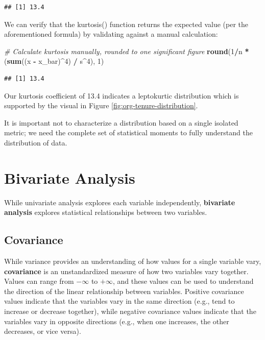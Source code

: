 \documentclass[]{book}
\newenvironment{Shaded}{\begin{snugshade}}{\end{snugshade}}
\newcommand{\CommentTok}[1]{\textcolor[rgb]{0.56,0.35,0.01}{\textit{#1}}}
\newcommand{\DecValTok}[1]{\textcolor[rgb]{0.00,0.00,0.81}{#1}}
\newcommand{\KeywordTok}[1]{\textcolor[rgb]{0.13,0.29,0.53}{\textbf{#1}}}
\newcommand{\NormalTok}[1]{#1}
\newcommand{\OperatorTok}[1]{\textcolor[rgb]{0.81,0.36,0.00}{\textbf{#1}}}
\newcommand{\StringTok}[1]{\textcolor[rgb]{0.31,0.60,0.02}{#1}}
\begin{document}
\begin{verbatim}
## [1] 13.4
\end{verbatim}

We can verify that the kurtosis() function returns the expected value (per the aforementioned formula) by validating against a manual calculation:

\begin{Shaded}
\begin{Highlighting}[]
\CommentTok{# Calculate kurtosis manually, rounded to one significant figure}
\KeywordTok{round}\NormalTok{(}\DecValTok{1}\OperatorTok{/}\NormalTok{n }\OperatorTok{*}\StringTok{ }\NormalTok{(}\KeywordTok{sum}\NormalTok{((x }\OperatorTok{-}\StringTok{ }\NormalTok{x_bar)}\OperatorTok{^}\DecValTok{4}\NormalTok{) }\OperatorTok{/}\StringTok{ }\NormalTok{s}\OperatorTok{^}\DecValTok{4}\NormalTok{), }\DecValTok{1}\NormalTok{)}
\end{Highlighting}
\end{Shaded}

\begin{verbatim}
## [1] 13.4
\end{verbatim}

Our kurtosis coefficient of 13.4 indicates a leptokurtic distribution which is supported by the visual in Figure \ref{fig:org-tenure-distribution}.

It is important not to characterize a distribution based on a single isolated metric; we need the complete set of statistical moments to fully understand the distribution of data.

\hypertarget{bivariate-analysis}{%
\section{Bivariate Analysis}\label{bivariate-analysis}}

While univariate analysis explores each variable independently, \textbf{bivariate analysis} explores statistical relationships between two variables.

\hypertarget{covariance}{%
\subsection{Covariance}\label{covariance}}

While variance provides an understanding of how values for a single variable vary, \textbf{covariance} is an unstandardized measure of how two variables vary together. Values can range from \(-\infty\) to \(+\infty\), and these values can be used to understand the direction of the linear relationship between variables. Positive covariance values indicate that the variables vary in the same direction (e.g., tend to increase or decrease together), while negative covariance values indicate that the variables vary in opposite directions (e.g., when one increases, the other decreases, or vice versa).
\end{document}
